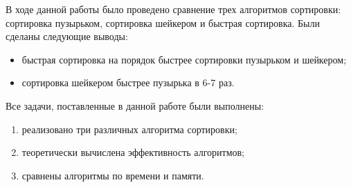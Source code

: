\newpage
{}

В ходе данной работы было проведено сравнение трех алгоритмов сортировки: сортировка
пузырьком, сортировка шейкером и быстрая сортировка. Были сделаны следующие выводы:

\begin{itemize}
    \item быстрая сортировка на порядок быстрее сортировки пузырьком и шейкером;
    \item сортировка шейкером быстрее пузырька в 6-7 раз.
\end{itemize}

Все задачи, поставленные в данной работе были выполнены:

\begin{enumerate}
    \item реализовано три различных алгоритма сортировки;
    \item теоретически вычислена эффективность алгоритмов;
    \item сравнены алгоритмы по времени и памяти.
\end{enumerate}
